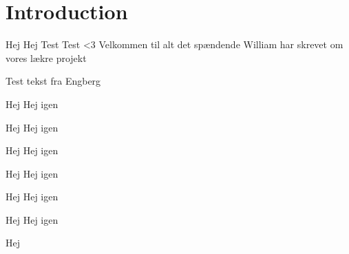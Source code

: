 \chapter{Introduction}
Hej Hej Test Test <3
Velkommen til alt det spændende William har skrevet om vores lækre projekt

Test tekst fra Engberg

\begin{defn}{Hej}
Hej igen
\end{defn}

\begin{thmx}{Hej}
Hej igen
\end{thmx}


\begin{lem}{Hej}
Hej igen
\end{lem}

\begin{prop}{Hej}
Hej igen
\end{prop}

\begin{kor}{Hej}
Hej igen
\end{kor}

\begin{exmp}{Hej}
Hej igen
\end{exmp}

\begin{bev}
Hej
\end{bev}